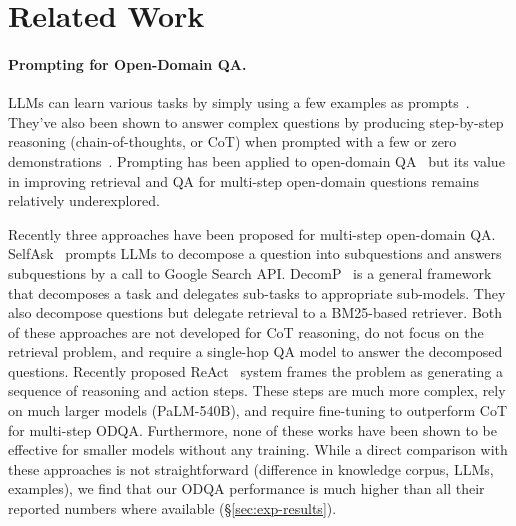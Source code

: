 \section{Related Work}
\label{sec:related_work}

\paragraph{Prompting for Open-Domain QA.}

LLMs can learn various tasks by simply using a few examples as prompts~\cite{originalgpt3}. They've also been shown to answer complex questions by producing step-by-step reasoning (chain-of-thoughts, or CoT) when prompted with a few or zero demonstrations~\cite{cot, zerocot}. Prompting has been applied to open-domain QA~\cite{internet-augmented-qa,recitationlm,Yu2022GenerateRT} but its value in improving retrieval and QA for multi-step open-domain questions remains relatively underexplored.

Recently three approaches have been proposed for multi-step open-domain QA. SelfAsk~\cite{selfask} prompts LLMs to decompose a question into subquestions and answers subquestions by a call to Google Search API. DecomP~\cite{decomp} is a general framework that decomposes a task and delegates sub-tasks to appropriate sub-models. They also decompose questions but delegate retrieval to a BM25-based retriever. Both of these approaches are not developed for CoT reasoning, do not focus on the retrieval problem, and require a single-hop QA model to answer the decomposed questions. Recently proposed ReAct~\cite{react} system frames the problem as generating a sequence of reasoning and action steps. These steps are much more complex, rely on much larger models (PaLM-540B), and require fine-tuning to outperform CoT for multi-step ODQA. Furthermore, none of these works have been shown to be effective for smaller models without any training. While a direct comparison with these approaches is not straightforward (difference in knowledge corpus, LLMs, examples), we find that our ODQA performance is much higher than all their reported numbers where available (\S\ref{sec:exp-results}).


